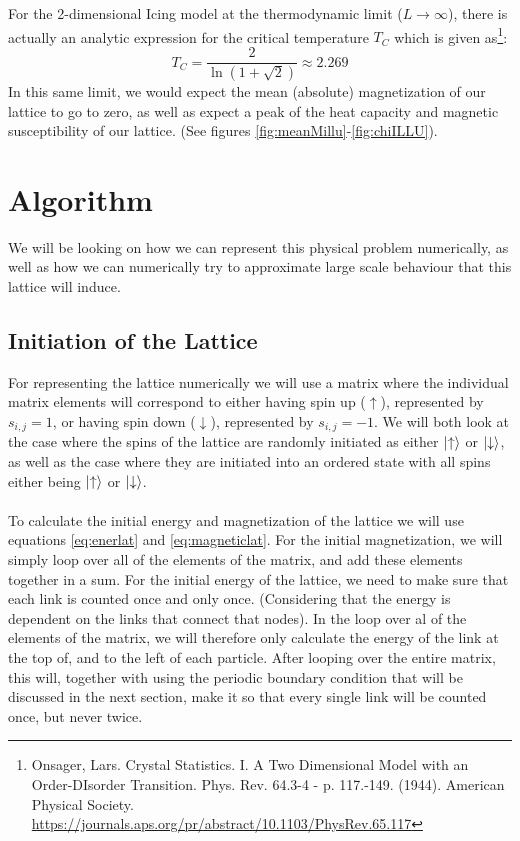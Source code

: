 \documentclass[reprint,english,notitlepage]{revtex4-1}  %
\begin{document}
\\
\\
For the 2-dimensional Icing model at the thermodynamic limit ($L\to\infty$), there is actually an analytic expression for the critical temperature $T_C$ which is given as\footnote{Onsager, Lars. Crystal Statistics. I. A Two Dimensional Model with an Order-DIsorder Transition. Phys. Rev. 64.3-4 - p. 117.-149. (1944). American Physical Society. \url{https://journals.aps.org/pr/abstract/10.1103/PhysRev.65.117}}: 
\begin{equation}\label{eq:onsager}
    T_C = \frac{2}{\ln{(1+\sqrt{2})}} \approx 2.269
\end{equation}
In this same limit, we would expect the mean (absolute) magnetization of our lattice to go to zero, as well as expect a peak of the heat capacity and magnetic susceptibility of our lattice. (See figures \ref{fig:meanMillu}-\ref{fig:chiILLU}).


\section{Algorithm}

We will be looking on how we can represent this physical problem numerically, as well as how we can numerically try to approximate large scale behaviour that this lattice will induce.

\subsection{Initiation of the Lattice}

For representing the lattice numerically we will use a matrix where the individual matrix elements will correspond to either having spin up ($\uparrow$), represented by $s_{i,j} = 1$, or having spin down ($\downarrow$), represented by $s_{i,j} = -1$. We will both look at the case where the spins of the lattice are randomly initiated as either $\ket{\uparrow}$ or $\ket{\downarrow}$, as well as the case where they are initiated into an ordered state with all spins either being $\ket{\uparrow}$ or $\ket{\downarrow}$.
\\
\\
To calculate the initial energy and magnetization of the lattice we will use equations \ref{eq:enerlat} and \ref{eq:magneticlat}. For the initial magnetization, we will simply loop over all of the elements of the matrix, and add these elements together in a sum. For the initial energy of the lattice, we need to make sure that each link is counted once and only once. (Considering that the energy is dependent on the links that connect that nodes). In the loop over al of the elements of the matrix, we will therefore only calculate the energy of the link at the top of, and to the left of each particle. After looping over the entire matrix, this will, together with using the periodic boundary condition that will be discussed in the next section, make it so that every single link will be counted once, but never twice. 
\end{document}
